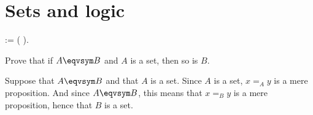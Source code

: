 \begin{coqdoccode}
\end{coqdoccode}
\section{Sets and logic}

\begin{coqdoccode}
\coqdocemptyline
\coqdocnoindent
{}   := ( ).\coqdoceol
\coqdocemptyline
\end{coqdoccode}
Prove that if $A \eqvsym B$ and $A$ is a set, then so is $B$.


 \soln
Suppose that $A \eqvsym B$ and that $A$ is a set.  Since $A$ is a set, $x =_{A}
y$ is a mere proposition.  And since $A \eqvsym B$, this means that $x =_{B} y$
is a mere proposition, hence that $B$ is a set.


